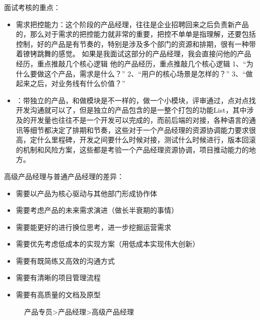 \documentclass[letterpaper,11pt,english]{sphinxmanual}
\begin{document}
面试考核的重点：
\begin{itemize}
\item {} 
需求把控能力：这个阶段的产品经理，往往是企业招聘回来之后负责新产品的，那么对于需求的把控能力就非常的重要，把控不单单是指理解，还要包括控制，好的产品是有节奏的，特别是涉及多个部门的资源和排期，很有一种带着镣铐跳舞的感觉。
如果是我面试这部分的产品经理，我会直接问他的产品经历，重点推敲几个核心逻辑
他的产品经历，重点推敲几个核心逻辑
1、“为什么要做这个产品，需求是什么？” 2、“用户的核心场景是怎样的？”
3、“做起来之后，对业务线有什么价值？”

\item {} 
：带独立的产品，和做模块是不一样的，做一个小模块，评审通过，点对点找开发沟通就可以了，但是独立的产品包含的是一整个打包的功能List，其中涉及的开发量也往往不是一个开发可以完成的，而前后端的对接，各种语言的通讯等细节都决定了排期和节奏，这些对于一个产品经理的资源协调能力要求很高，定什么里程碑，开发之间要什么时候对接，测试什么时候进行，版本回滚的机制和风险方案，这些都是考验一个产品经理资源协调，项目推动能力的地方。

\end{itemize}

高级产品经理与普通产品经理的差异：
\begin{itemize}
\item {} 
需要以产品为核心驱动与其他部门形成协作体

\item {} 
需要考虑产品的未来需求演进（做长半衰期的事情）

\item {} 
需要能更好的进行换位思考，进一步挖掘运营需求

\item {} 
需要优先考虑低成本的实现方案（用低成本实现伟大创新）

\item {} 
需要有既简练又高效的沟通方式

\item {} 
需要有清晰的项目管理流程

\item {} 
需要有高质量的文档及原型

\end{itemize}

\begin{figure}[H]
\centering
\capstart

\noindent{}
\caption{产品专员\sphinxhyphen{}>产品经理\sphinxhyphen{}>高级产品经理}\label{\detokenize{chapter_experience/career_path:id26}}\end{figure}
\end{document}

